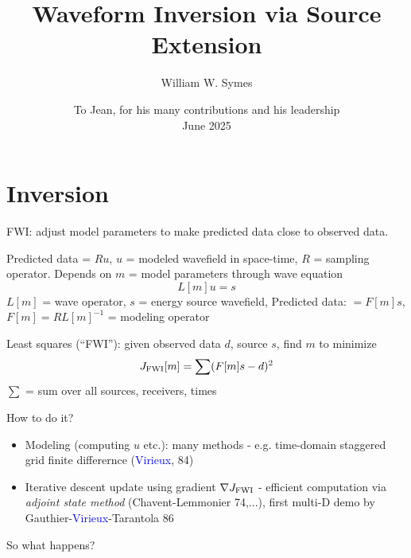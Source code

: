 \documentclass[xcolor=dvipsnames,12pt,aspectratio=169]{beamer}
\title[]{Waveform Inversion via Source Extension}
\author[]{William W. Symes}
\institute[]{\inst{} Rice University}
\date{To Jean, for his many contributions and his leadership\\June 2025}
\begin{document}
\frame{
\titlepage
}

\renewcommand{\thefootnote}{\fnsymbol{footnote}}


\section{Inversion}

\begin{frame}%
FWI: adjust model parameters to make predicted data close to
observed data.

Predicted data = $Ru$, $u$ = modeled wavefield in space-time, $R$ =
sampling operator. Depends on $m$ = model parameters through wave equation
\[
L[m]u = s 
\]
$L[m]$ = wave operator, $s$ = energy source wavefield, Predicted data: $= F[m]s$, $F[m] = RL[m]^{-1}$ =
modeling operator

Least squares (``FWI''): given observed data $d$, source $s$, find $m$ to minimize
\[
J_{\rm FWI}[m] = \sum (F[m]s - d)^2
\]
$\sum$ = sum over all sources, receivers, times
\end{frame}

\begin{frame}
How to do it?

\begin{itemize}
\item Modeling (computing $u$ etc.): many methods - e.g. time-domain
  staggered grid finite differernce (\textcolor{blue}{Virieux}, 84)
\vspace{0,5cm}
\item Iterative descent update using gradient $\nabla J_{\rm FWI}$ - efficient
  computation via {\em adjoint state method} (Chavent-Lemmonier
  74,...), first multi-D demo by Gauthier-\textcolor{blue}{Virieux}-Tarantola 86
\end{itemize}

So what happens?
\end{frame}
\end{document}
